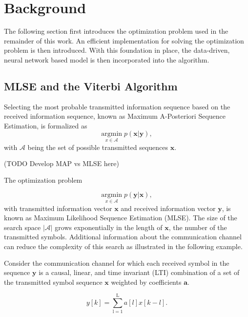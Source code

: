 \documentclass[12pt,a4paper]{report}
\begin{document}
\section{Background}
The following section first introduces the optimization problem used in the remainder of this work. An efficient implementation for solving the optimization problem is then introduced. With this foundation in place, the data-driven, neural network based model is then incorporated into the algorithm. 
\subsection{MLSE and the Viterbi Algorithm}

Selecting the most probable transmitted information sequence based on the received information sequence, known as Maximum A-Posteriori Sequence Estimation, is formalized as
\begin{equation*}
\underset{x\in\mathcal{A}}{\text{argmin}} \; p(\mathbf{x}|\mathbf{y}),
\end{equation*} with $\mathcal{A}$ being the set of possible transmitted sequences $\mathbf{x}$.

(TODO Develop MAP vs MLSE here)

The optimization problem

\begin{equation}\label{opt_problem}
\underset{x \in \textit{$\mathcal{A}$}}{\text{argmin}} \; p(\mathbf{y}|\mathbf{x}),
\end{equation}
 with transmitted information vector $\mathbf{x}$ and received information vector $\mathbf{y}$, is known as Maximum Likelihood Sequence Estimation (MLSE). 
The size of the search space $|\mathcal{A}|$ grows exponentially in the length of $\mathbf{x}$, the number of the transmitted symbols. Additional information about the communication channel can reduce the complexity of this search as illustrated in the following example.
\par
Consider the communication channel for which each received symbol in the sequence $\mathbf{y}$ is a causal, linear, and time invariant (LTI) combination of a set of the transmitted symbol sequence $\mathbf{x}$ weighted by coefficients $\mathbf{a}$. 

\begin{equation*}
y[k] = \sum_{\mathrm{l=1}}^{\mathrm{L}} a[l]x[k-l].
\end{equation*}
\end{document}
